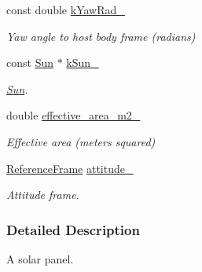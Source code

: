 \begin{DoxyCompactItemize}
const double \hyperlink{classosse_1_1collaborate_1_1_solar_panel_a37c98f5e1c13ab13b81e195abcca91a5}{k\+Yaw\+Rad\+\_\+}
\begin{DoxyCompactList}\small\item\em Yaw angle to host body frame (radians) \end{DoxyCompactList}\item 
\mbox{\label{classosse_1_1collaborate_1_1_solar_panel_ad99923d6f3d925443fb29b97cb05f781}} 
const \hyperlink{classosse_1_1collaborate_1_1_sun}{Sun} $\ast$ \hyperlink{classosse_1_1collaborate_1_1_solar_panel_ad99923d6f3d925443fb29b97cb05f781}{k\+Sun\+\_\+}
\begin{DoxyCompactList}\small\item\em \hyperlink{classosse_1_1collaborate_1_1_sun}{Sun}. \end{DoxyCompactList}\item 
\mbox{\label{classosse_1_1collaborate_1_1_solar_panel_ab229ffc8235cb471fd15e78d8d0cb68e}} 
double \hyperlink{classosse_1_1collaborate_1_1_solar_panel_ab229ffc8235cb471fd15e78d8d0cb68e}{effective\+\_\+area\+\_\+m2\+\_\+}
\begin{DoxyCompactList}\small\item\em Effective area (meters squared) \end{DoxyCompactList}\item 
\mbox{\label{classosse_1_1collaborate_1_1_solar_panel_a4d0770f4bfd51e69538539700d32ecb3}} 
\hyperlink{classosse_1_1collaborate_1_1_reference_frame}{Reference\+Frame} \hyperlink{classosse_1_1collaborate_1_1_solar_panel_a4d0770f4bfd51e69538539700d32ecb3}{attitude\+\_\+}
\begin{DoxyCompactList}\small\item\em Attitude frame. \end{DoxyCompactList}\end{DoxyCompactItemize}


\subsubsection{Detailed Description}
A solar panel. 

